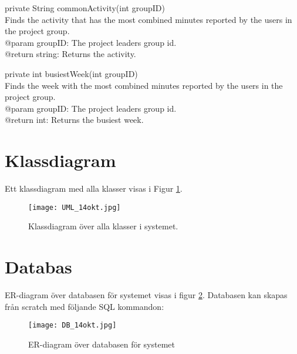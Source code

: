 \documentclass[a4paper]{article}
\begin{document}
\vspace{5mm}
\begin{hangparas}{1.5em}{1}
private String commonActivity(int groupID)\\
Finds the activity that has the most combined minutes reported by the users in the project group.\\
@param groupID: The project leaders group id.\\
@return string: Returns the activity.
\end{hangparas}

\vspace{5mm}
\begin{hangparas}{1.5em}{1}
private int busiestWeek(int groupID)\\
Finds the week with the most combined minutes reported by the users in the project group.\\
@param groupID: The project leaders group id.\\
@return int: Returns the busiest week.\\
\end{hangparas}

\section{Klassdiagram}
Ett klassdiagram med alla klasser visas i Figur \ref{umldiagram}.

\begin{figure}[h!]
\centering
\texttt{[image: UML\_14okt.jpg]}
\caption{Klassdiagram över alla klasser i systemet. \label{umldiagram}}
\end{figure}



\section{Databas}

ER-diagram över databasen för systemet visas i figur \ref{ER}. Databasen kan skapas från scratch med följande SQL kommandon: \\

\begin{figure}[ht!]
\centering
\texttt{[image: DB\_14okt.jpg]}
\caption{ER-diagram över databasen för systemet \label{ER}}
\end{figure}
\end{document}
